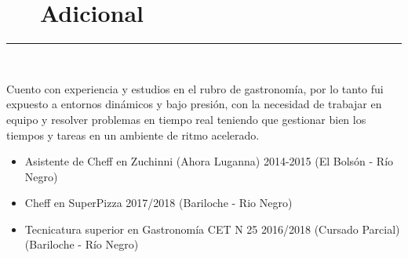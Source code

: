 \documentclass{article}
\begin{document}
\section*{ ~~ Adicional}

\hrule

\
\newline    
\


\noident 
Cuento con experiencia y estudios en el rubro de gastronomía, por lo tanto fui expuesto a entornos dinámicos y bajo presión, con la necesidad de trabajar en equipo y resolver problemas en tiempo real teniendo que gestionar bien los tiempos y tareas en un ambiente de ritmo acelerado.    


\begin{itemize}
    \item Asistente de Cheff en Zuchinni (Ahora Luganna) 2014-2015 (El Bolsón - Río Negro)
    \item Cheff en SuperPizza 2017/2018 (Bariloche - Rio Negro)
    \item Tecnicatura superior en Gastronomía CET N 25 2016/2018 (Cursado Parcial)(Bariloche - Río Negro)
\end{itemize}
\end{document}
